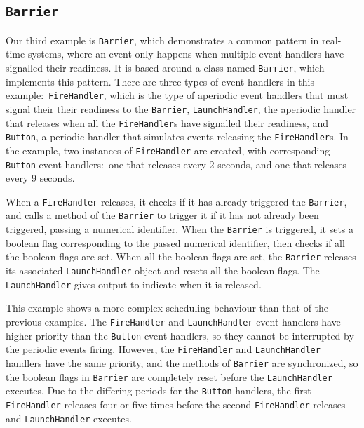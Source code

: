 
\subsection{\texorpdfstring{\texttt{Barrier}}{Barrier}}
\label{barrier-subsection}

Our third example is \texttt{Barrier}, which demonstrates a common
pattern in real-time systems, where an event only happens when
multiple event handlers have signalled their readiness.
It is based around a class named \texttt{Barrier}, which implements
this pattern.
There are three types of event handlers in this
example:~\texttt{FireHandler}, which is the type of aperiodic event
handlers that must signal their their readiness to the
\texttt{Barrier}, \texttt{LaunchHandler}, the aperiodic handler that
releases when all the \texttt{FireHandler}s have signalled their
readiness, and \texttt{Button}, a periodic handler that simulates
events releasing the \texttt{FireHandler}s.
In the example, two instances of \texttt{FireHandler} are created,
with corresponding \texttt{Button} event handlers:~one that releases
every 2 seconds, and one that releases every 9 seconds.

When a \texttt{FireHandler} releases, it checks if it has already
triggered the \texttt{Barrier}, and calls a method of the
\texttt{Barrier} to trigger it if it has not already been triggered,
passing a numerical identifier.
When the \texttt{Barrier} is triggered, it sets a boolean flag
corresponding to the passed numerical identifier, then checks if all
the boolean flags are set.
When all the boolean flags are set, the \texttt{Barrier} releases its
associated \texttt{LaunchHandler} object and resets all the boolean
flags.
The \texttt{LaunchHandler} gives output to indicate when it is
released.

This example shows a more complex scheduling behaviour than that of
the previous examples.
The \texttt{FireHandler} and \texttt{LaunchHandler} event handlers
have higher priority than the \texttt{Button} event handlers, so they
cannot be interrupted by the periodic events firing.
However, the \texttt{FireHandler} and \texttt{LaunchHandler} handlers
have the same priority, and the methods of \texttt{Barrier} are
synchronized, so the boolean flags in \texttt{Barrier} are completely
reset before the \texttt{LaunchHandler} executes.
Due to the differing periods for the \texttt{Button} handlers, the
first \texttt{FireHandler} releases four or five times before the second
\texttt{FireHandler} releases and \texttt{LaunchHandler} executes.

